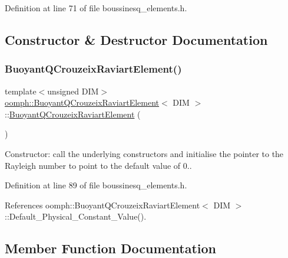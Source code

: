 Definition at line 71 of file boussinesq\+\_\+elements.\+h.



\subsection{Constructor \& Destructor Documentation}
\mbox{\label{classoomph_1_1BuoyantQCrouzeixRaviartElement_a9651742d190071d973ed5c154341d82b}} 
\subsubsection{\texorpdfstring{Buoyant\+Q\+Crouzeix\+Raviart\+Element()}{BuoyantQCrouzeixRaviartElement()}}
{\footnotesize\ttfamily template$<$unsigned D\+IM$>$ \\
\hyperlink{classoomph_1_1BuoyantQCrouzeixRaviartElement}{oomph\+::\+Buoyant\+Q\+Crouzeix\+Raviart\+Element}$<$ D\+IM $>$\+::\hyperlink{classoomph_1_1BuoyantQCrouzeixRaviartElement}{Buoyant\+Q\+Crouzeix\+Raviart\+Element} (\begin{DoxyParamCaption}{ }\end{DoxyParamCaption})\hspace{0.3cm}{\ttfamily [inline]}}



Constructor\+: call the underlying constructors and initialise the pointer to the Rayleigh number to point to the default value of 0.. 



Definition at line 89 of file boussinesq\+\_\+elements.\+h.



References oomph\+::\+Buoyant\+Q\+Crouzeix\+Raviart\+Element$<$ D\+I\+M $>$\+::\+Default\+\_\+\+Physical\+\_\+\+Constant\+\_\+\+Value().



\subsection{Member Function Documentation}
\mbox{\label{classoomph_1_1BuoyantQCrouzeixRaviartElement_a53d343548b707c62e9f11a04d2dda986}} 
